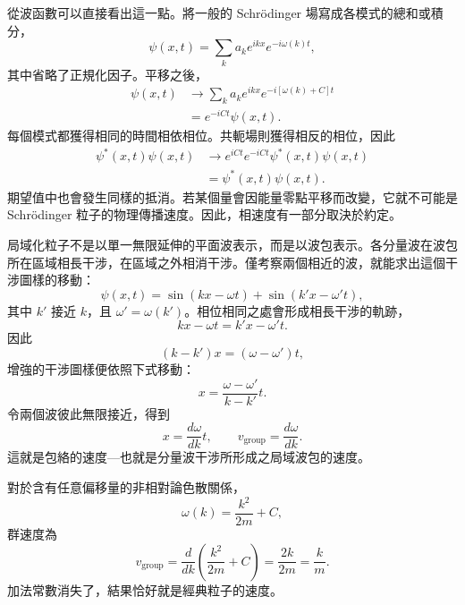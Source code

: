 從波函數可以直接看出這一點。將一般的 Schr\"odinger 場寫成各模式的總和或積分，
\begin{equation}
\psi(x,t)=\sum_k a_k e^{ikx}e^{-i\omega(k)t},
\end{equation}
其中省略了正規化因子。平移之後，
\begin{align}
\psi(x,t)
&\longrightarrow
\sum_k a_k e^{ikx}e^{-i[\omega(k)+C]t}
\\
&=e^{-iCt}\psi(x,t).
\end{align}
每個模式都獲得相同的時間相依相位。共軛場則獲得相反的相位，因此
\begin{equation}
\begin{aligned}
\psi^*(x,t)\psi(x,t)
&\longrightarrow
e^{iCt}e^{-iCt}\psi^*(x,t)\psi(x,t)
\\
&=\psi^*(x,t)\psi(x,t).
\end{aligned}
\end{equation}
期望值中也會發生同樣的抵消。若某個量會因能量零點平移而改變，它就不可能是 Schr\"odinger 粒子的物理傳播速度。因此，相速度有一部分取決於約定。

局域化粒子不是以單一無限延伸的平面波表示，而是以波包表示。各分量波在波包所在區域相長干涉，在區域之外相消干涉。僅考察兩個相近的波，就能求出這個干涉圖樣的移動：
\begin{equation}
\psi(x,t)=
\sin(kx-\omega t)+
\sin(k'x-\omega't),
\end{equation}
其中 \(k'\) 接近 \(k\)，且 \(\omega'=\omega(k')\)。相位相同之處會形成相長干涉的軌跡，
\begin{equation}
kx-\omega t=k'x-\omega't.
\end{equation}
因此
\begin{equation}
(k-k')x=(\omega-\omega')t,
\end{equation}
增強的干涉圖樣便依照下式移動：
\begin{equation}
x=\frac{\omega-\omega'}{k-k'}t.
\end{equation}
令兩個波彼此無限接近，得到
\begin{equation}
x=\frac{d\omega}{dk}t,
\qquad
v_{\mathrm{group}}=\frac{d\omega}{dk}.
\end{equation}
這就是包絡的速度---也就是分量波干涉所形成之局域波包的速度。

對於含有任意偏移量的非相對論色散關係，
\begin{equation}
\omega(k)=\frac{k^2}{2m}+C,
\end{equation}
群速度為
\begin{equation}
v_{\mathrm{group}}
=\frac{d}{dk}\left(\frac{k^2}{2m}+C\right)
=\frac{2k}{2m}
=\frac{k}{m}.
\end{equation}
加法常數消失了，結果恰好就是經典粒子的速度。

